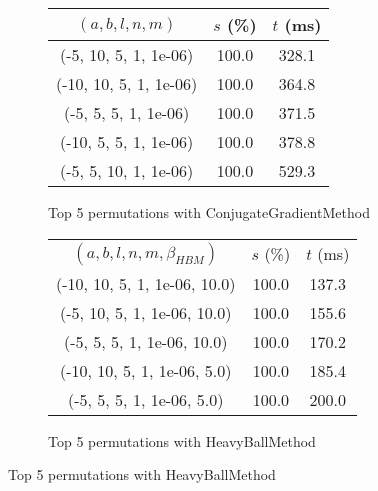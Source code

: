 \begin{figure}[H]
\begin{subfigure}[ht]{.5\textwidth}
\begin{tabular}{|c|c|c|}
\hline
\rowcolor{gray!25}
$(a,b,l,n,m)$ & $s$ (\%) & $t$ (ms) \\
\hline
(-5, 10, 5, 1, 1e-06) & 100.0 & 328.1 \\
(-10, 10, 5, 1, 1e-06) & 100.0 & 364.8 \\
(-5, 5, 5, 1, 1e-06) & 100.0 & 371.5 \\
(-10, 5, 5, 1, 1e-06) & 100.0 & 378.8 \\
(-5, 5, 10, 1, 1e-06) & 100.0 & 529.3 \\
\hline
\end{tabular}
\caption{Top 5 permutations with ConjugateGradientMethod}
\label{subfig:param_comp_MatrixSquareSum_ConjugateGradientMethod_UniformSearch}
\end{subfigure}
\hfill
\begin{subfigure}[ht]{.5\textwidth}
\begin{tabular}{|c|c|c|}
\hline
\rowcolor{gray!25}
\multicolumn{3}{|c|}{HeavyBallMethod} \\
\hline
\rowcolor{gray!25}
$(a,b,l,n,m,\beta_{HBM})$ & $s$ (\%) & $t$ (ms) \\
\hline
(-10, 10, 5, 1, 1e-06, 10.0) & 100.0 & 137.3 \\
(-5, 10, 5, 1, 1e-06, 10.0) & 100.0 & 155.6 \\
(-5, 5, 5, 1, 1e-06, 10.0) & 100.0 & 170.2 \\
(-10, 10, 5, 1, 1e-06, 5.0) & 100.0 & 185.4 \\
(-5, 5, 5, 1, 1e-06, 5.0) & 100.0 & 200.0 \\
\hline
\end{tabular}
\caption{Top 5 permutations with HeavyBallMethod}
\label{subfig:param_comp_MatrixSquareSum_HeavyBallMethod_UniformSearch}
\end{subfigure}
\end{figure}

